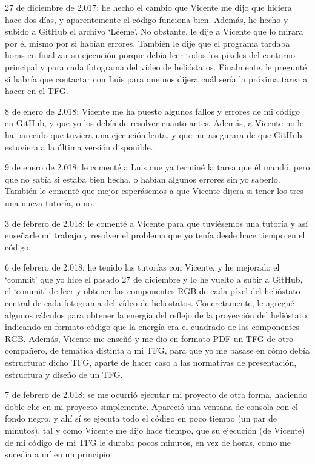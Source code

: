 \documentclass[12pt]{article}
\begin{document}
27 de diciembre de 2.017: he hecho el cambio que Vicente me dijo que hiciera hace dos días, y aparentemente el código funciona bien. Además, he hecho y subido a GitHub el archivo ‘Léeme’. No obstante, le dije a Vicente que lo mirara por él mismo por si habían errores. También le dije que el programa tardaba horas en finalizar su ejecución porque debía leer todos los píxeles del contorno principal y para cada fotograma del vídeo de helióstatos. Finalmente, le pregunté si habría que contactar con Luis para que nos dijera cuál sería la próxima tarea a hacer en el TFG.

8 de enero de 2.018: Vicente me ha puesto algunos fallos y errores de mi código en GitHub, y que yo los debía de resolver cuanto antes. Además, a Vicente no le ha parecido que tuviera una ejecución lenta, y que me asegurara de que GitHub estuviera a la última versión disponible.

9 de enero de 2.018: le comenté a Luis que ya terminé la tarea que él mandó, pero que no sabía si estaba bien hecha, o habían algunos errores sin yo saberlo. También le comenté que mejor esperásemos a que Vicente dijera si tener los tres una nueva tutoría, o no.

3 de febrero de 2.018: le comenté a Vicente para que tuviésemos una tutoría y así enseñarle mi trabajo y resolver el problema que yo tenía desde hace tiempo en el código.

6 de febrero de 2.018: he tenido las tutorías con Vicente, y he mejorado el ‘commit’ que yo hice el pasado 27 de diciembre y lo he vuelto a subir a GitHub, el ‘commit’ de leer y obtener las componentes RGB de cada píxel del helióstato central de cada fotograma del vídeo de heliostatos. Concretamente, le agregué algunos cálculos para obtener la energía del reflejo de la proyección del helióstato, indicando en formato código que la energía era el cuadrado de las componentes RGB. Además, Vicente me enseñó y me dio en formato PDF un TFG de otro compañero, de temática distinta a mi TFG, para que yo me basase en cómo debía estructurar dicho TFG, aparte de hacer caso a las normativas de presentación, estructura y diseño de un TFG.

7 de febrero de 2.018: se me ocurrió ejecutar mi proyecto de otra forma, haciendo doble clic en mi proyecto simplemente. Apareció una ventana de consola con el fondo negro, y ahí sí se ejecuta todo el código en poco tiempo (un par de minutos), tal y como Vicente me dijo hace tiempo, que su ejecución (de Vicente) de mi código de mi TFG le duraba pocos minutos, en vez de horas, como me sucedía a mí en un principio.
\end{document}
